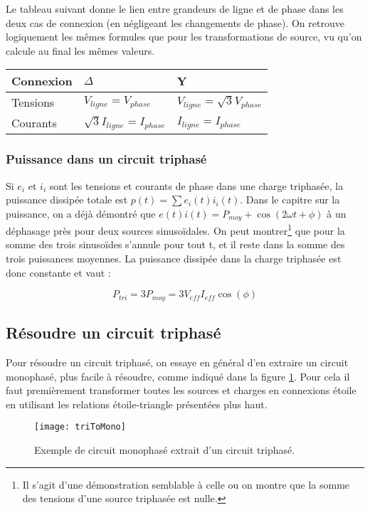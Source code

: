 Le tableau suivant donne le lien entre grandeurs de ligne et de phase dans les deux cas de connexion (en négligeant les changements de phase). On retrouve logiquement les mêmes formules que pour les transformations de source, vu qu'on calcule au final les mêmes valeurs.
\begin{center}
    \begin{tabular}{ | l | l | l |}
    \hline
    Connexion  & \textbf{$\Delta$} & \textbf{Y} \\ \hline
    Tensions & $V_{ligne} = V_{phase}$ & $V_{ligne} = \sqrt{3}V_{phase}$  \\ \hline
    Courants & $\sqrt{3}I_{ligne} = I_{phase}$ & $I_{ligne} = I_{phase}$   \\ \hline
    \end{tabular}
\end{center}

\subsubsection*{Puissance dans un circuit triphasé}
Si $e_i$ et $i_i$ sont les tensions et courants de phase dans une charge triphasée, la puissance dissipée totale est $p(t) = \sum e_i(t)i_i(t)$. Dans le capitre sur la puissance, on a déjà démontré que $e(t)i(t) = P_{moy} + \cos(2 \omega t + \phi)$ à un déphasage près pour deux sources sinusoïdales. On peut montrer\footnote{Il s'agit d'une démonstration semblable à celle ou on montre que la somme des tensions d'une source triphasée est nulle.} que pour la somme des trois sinusoïdes s'annule pour tout t, et il reste dans la somme des trois puissances moyennes. La puissance dissipée dans la charge triphasée est donc constante et vaut :

\begin{equation}
P_{tri} = 3 P_{moy} = 3V_{eff}I_{eff}\cos(\phi)
\end{equation}

\subsection{Résoudre un circuit triphasé}
Pour résoudre un circuit triphasé, on essaye en général d'en extraire un circuit monophasé, plus facile à résoudre, comme indiqué dans la figure \ref{triMono}. Pour cela il faut premièrement transformer toutes les sources et charges en connexions étoile en utilisant les relations étoile-triangle présentées plus haut.

\begin{figure}[H]
	\centering
    \texttt{[image: triToMono]}
    \caption{Exemple de circuit monophasé extrait d'un circuit triphasé.}
     \label{triMono}
\end{figure}

